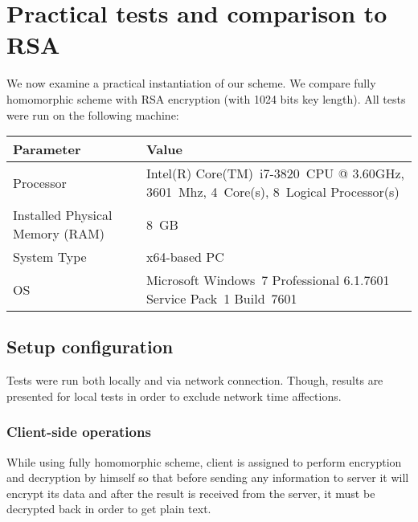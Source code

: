 

\section{Practical tests and comparison to RSA}

We now examine a practical instantiation of our scheme.
We compare fully homomorphic scheme with RSA encryption (with 1024 bits key length).
All tests were run on the following machine:

\noindent
\begin{tabulary}{\textwidth}{|L|L|}
	\hline
	\textbf{Parameter} & \textbf{Value} \\ \hline
	Processor & Intel(R) Core(TM)~i7-3820~CPU @ 3.60GHz, 3601~Mhz, 4~Core(s), 8~Logical Processor(s)\\ \hline
	Installed Physical Memory (RAM) & 8~GB\\ \hline
	System Type & x64-based PC \\ \hline
	OS & Microsoft Windows~7 Professional 6.1.7601 Service Pack~1 Build~7601 \\ \hline
\end{tabulary}

\subsection{Setup configuration}

Tests were run both locally and via network connection.
Though, results are presented for local tests in order to exclude network time affections.

\vspace{0.5cm}

\subsubsection{Client-side operations}

While using fully homomorphic scheme, client is assigned to perform encryption and decryption by himself so that before sending any information to server it will encrypt its data and after the result is received from the server, it must be decrypted back in order to get plain text.

